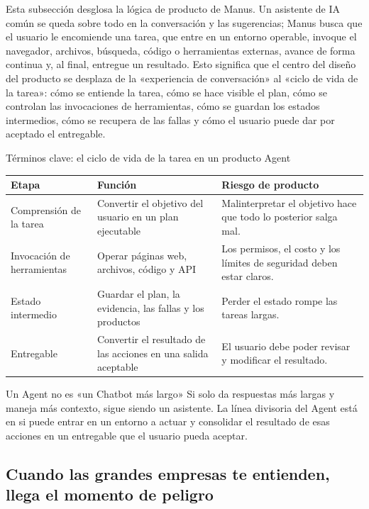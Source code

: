 \documentclass[a4paper]{article}
\begin{document}
Esta subsección desglosa la lógica de producto de Manus. Un asistente de IA común se queda sobre todo en la conversación y las sugerencias; Manus busca que el usuario le encomiende una tarea, que entre en un entorno operable, invoque el navegador, archivos, búsqueda, código o herramientas externas, avance de forma continua y, al final, entregue un resultado. Esto significa que el centro del diseño del producto se desplaza de la «experiencia de conversación» al «ciclo de vida de la tarea»: cómo se entiende la tarea, cómo se hace visible el plan, cómo se controlan las invocaciones de herramientas, cómo se guardan los estados intermedios, cómo se recupera de las fallas y cómo el usuario puede dar por aceptado el entregable.

\begin{knowledgebox}{Términos clave: el ciclo de vida de la tarea en un producto Agent}
\noindent\begin{tabularx}{\textwidth}{p{}p{}X}
\toprule
Etapa & Función & Riesgo de producto \\
\midrule
Comprensión de la tarea & Convertir el objetivo del usuario en un plan ejecutable & Malinterpretar el objetivo hace que todo lo posterior salga mal. \\
Invocación de herramientas & Operar páginas web, archivos, código y API & Los permisos, el costo y los límites de seguridad deben estar claros. \\
Estado intermedio & Guardar el plan, la evidencia, las fallas y los productos & Perder el estado rompe las tareas largas. \\
Entregable & Convertir el resultado de las acciones en una salida aceptable & El usuario debe poder revisar y modificar el resultado. \\
\bottomrule
\end{tabularx}
\end{knowledgebox}

\begin{warningbox}{Un Agent no es «un Chatbot más largo»}
Si solo da respuestas más largas y maneja más contexto, sigue siendo un asistente. La línea divisoria del Agent está en si puede entrar en un entorno a actuar y consolidar el resultado de esas acciones en un entregable que el usuario pueda aceptar.
\end{warningbox}

\subsection{Cuando las grandes empresas te entienden, llega el momento de peligro}
\end{document}
